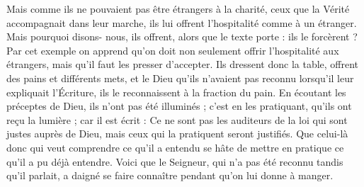  Mais comme ils ne pouvaient pas être étrangers à la charité, ceux que la Vérité accompagnait dans leur marche, ils lui offrent l’hospitalité comme à un étranger. Mais pourquoi disons- nous, ils offrent, alors que le texte porte : ils le forcèrent ? Par cet exemple on apprend qu’on doit non seulement offrir l’hospitalité aux étrangers, mais qu’il faut les presser d’accepter. Ils dressent donc la table, offrent des pains et différents mets, et le Dieu qu’ils n’avaient pas reconnu lorsqu’il leur expliquait l’Écriture, ils le reconnaissent à la fraction du pain. En écoutant les préceptes de Dieu, ils n’ont pas été illuminés ; c’est en les pratiquant, qu’ils ont reçu la lumière ; car il est écrit : Ce ne sont pas les auditeurs de la loi qui sont justes auprès de Dieu, mais ceux qui la pratiquent seront justifiés. Que celui-là donc qui veut comprendre ce qu’il a entendu se hâte de mettre en pratique ce qu’il a pu déjà entendre. Voici que le Seigneur, qui n’a pas été reconnu tandis qu’il parlait, a daigné se faire connaître pendant qu’on lui donne à manger.
